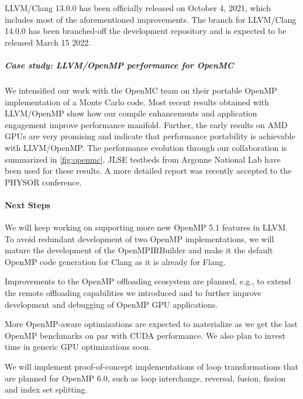 LLVM/Clang 13.0.0 has been officially released on October 4, 2021, which includes most of the aforementioned improvements. The branch for LLVM/Clang 14.0.0 has been branched-off the development repository and is expected to be released March 15 2022.


\subparagraph{Case study: LLVM/OpenMP performance for OpenMC}

We intensified our work with the OpenMC team on their portable OpenMP implementation of a Monte Carlo code.
Most recent results obtained with LLVM/OpenMP show how our compile enhancements and application engagement improve performance manifold.
Further, the early results on AMD GPUs are very promising and indicate that performance portability is achievable with LLVM/OpenMP.
The performance evolution through our collaboration is summarized in \autoref{fig:openmc}. JLSE testbeds from Argonne National Lab have been used for these results.  
A more detailed report was recently accepted to the PHYSOR conference.



\paragraph{Next Steps}
We will keep working on supporting more new OpenMP 5.1 features in LLVM.
%
To avoid redundant development of two OpenMP implementations, we will mature the development of the OpenMPIRBuilder and make it the default OpenMP code generation for Clang as it is already for Flang.

Improvements to the OpenMP offloading ecosystem are planned, e.g., to extend the remote offloading capabilities we introduced and to further improve development and debugging of OpenMP GPU applications.

More OpenMP-aware optimizations are expected to materialize as we get the last OpenMP benchmarks on par with CUDA performance. We also plan to invest time in generic GPU optimizations soon.

We will implement proof-of-concept implementations of loop transformations that are planned for OpenMP 6.0, such as loop interchange, reversal, fusion, fission and index set splitting.


